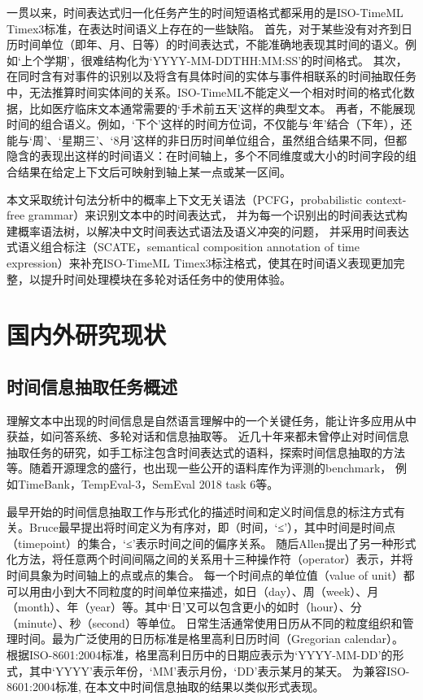 一贯以来，时间表达式归一化任务产生的时间短语格式都采用的是ISO-TimeML Timex3标准，在表达时间语义上存在的一些缺陷。
首先，对于某些没有对齐到日历时间单位（即年、月、日等）的时间表达式，不能准确地表现其时间的语义。例如‘上个学期’，很难结构化为‘YYYY-MM-DDTHH:MM:SS’的时间格式。
其次，在同时含有对事件的识别以及将含有具体时间的实体与事件相联系的时间抽取任务中，无法推算时间实体间的关系。ISO-TimeML不能定义一个相对时间的格式化数据，比如医疗临床文本通常需要的‘手术前五天’这样的典型文本。
再者，不能展现时间的组合语义。例如，‘下个’这样的时间方位词，不仅能与‘年’结合（下年），还能与‘周’、‘星期三’、‘8月’这样的非日历时间单位组合，虽然组合结果不同，但都隐含的表现出这样的时间语义：在时间轴上，多个不同维度或大小的时间字段的组合结果在给定上下文后可映射到轴上某一点或某一区间。

本文采取统计句法分析中的概率上下文无关语法（PCFG，probabilistic context-free grammar）来识别文本中的时间表达式，
并为每一个识别出的时间表达式构建概率语法树，以解决中文时间表达式语法及语义冲突的问题，
并采用时间表达式语义组合标注\cite{bethard-parker-2016-semantically}（SCATE，semantical composition annotation of time expression）来补充ISO-TimeML Timex3标注格式，使其在时间语义表现更加完整，以提升时间处理模块在多轮对话任务中的使用体验。

\section{国内外研究现状}

\subsection{时间信息抽取任务概述}

理解文本中出现的时间信息是自然语言理解中的一个关键任务，能让许多应用从中获益，如问答系统、多轮对话和信息抽取等。
近几十年来都未曾停止对时间信息抽取任务的研究，如手工标注包含时间表达式的语料，探索时间信息抽取的方法等。随着开源理念的盛行，也出现一些公开的语料库作为评测的benchmark，
例如TimeBank\cite{Pustejovsky03}，TempEval-3\cite{uzzaman-etal-2013-semeval}，SemEval 2018 task 6\cite{laparra-etal-2018-semeval}等。

最早开始的时间信息抽取工作与形式化的描述时间和定义时间信息的标注方式有关。Bruce\cite{bruce1972model}最早提出将时间定义为有序对，即（时间，‘≤’），其中时间是时间点（timepoint）的集合，‘≤’表示时间之间的偏序关系。
随后Allen\cite{allen1983maintaining}提出了另一种形式化方法，将任意两个时间间隔之间的关系用十三种操作符（operator）表示，并将时间具象为时间轴上的点或点的集合。
每一个时间点的单位值（value of unit）都可以用由小到大不同粒度的时间单位来描述，如日（day）、周（week）、月（month）、年（year）等。其中‘日’又可以包含更小的如时（hour）、分（minute）、秒（second）等单位。
日常生活通常使用日历从不同的粒度组织和管理时间。最为广泛使用的日历标准是格里高利日历时间（Gregorian calendar）。
根据ISO-8601:2004标准，格里高利日历中的日期应表示为‘YYYY-MM-DD’的形式，其中‘YYYY’表示年份，‘MM’表示月份，‘DD’表示某月的某天。
为兼容ISO-8601:2004标准, 在本文中时间信息抽取的结果以类似形式表现。

